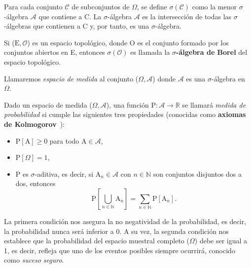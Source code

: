 \begin{definicion}\label{def:sigma-algebra-borel}
    Para cada conjunto $\mathcal{C}$ de subconjuntos de $\Omega$, se define $\sigma(\mathcal{C})$ como la menor $\sigma$-álgebra $\mathcal{A}$ que contiene a C. La $\sigma$-álgebra $\mathcal{A}$ es la intersección de todas las $\sigma$-álgebras que contienen a C y, por tanto, es una $\sigma$-álgebra.

    Si ($\mathrm{E}, \mathcal{O}$) es un espacio topológico, donde $\mathrm{O}$ es el conjunto formado por los conjuntos abiertos en E, entonces $\sigma(\mathcal{O})$ es llamada la \textbf{$\sigma$-álgebra de Borel} del espacio topológico.
\end{definicion}

Llamaremos \emph{espacio de medida} al conjunto ($\Omega, \mathcal{A}$) donde $\mathcal{A}$ es una $\sigma$-álgebra en $\Omega$.\newline

\begin{definicion}\label{def:medida-de-probabilidad}
    Dado un espacio de medida ($\Omega, \mathcal{A}$), una función $\mathrm{P}: \mathcal{A} \to \mathbb{R}$ se llamará \emph{medida de probabilidad} si cumple las siguientes tres propiedades (conocidas como \textbf{axiomas de Kolmogorov}~\cite{Kolmogorov1956}):

    \begin{itemize}
        \item $\mathrm{P}[\mathrm{A}] \ge 0$ para todo $\mathrm{A} \in \mathcal{A}$,
        \item $\mathrm{P}[\Omega]=1$,
        \item $\mathrm{P}$ es $\sigma$-aditiva, es decir, si $\mathrm{A}_n \in \mathcal{A}$ con $n \in \mathbb{N}$ son conjuntos disjuntos dos a dos, entonces 
        \[ \mathrm{P}\left[\bigcup_{n \in \mathbb{N}} \mathrm{A}_{n}\right] = \sum\limits_{n \in \mathbb{N}} \mathrm{P}[\mathrm{A}_n]. \]
    \end{itemize}
\end{definicion}

La primera condición nos asegura la no negatividad de la probabilidad, es decir, la probabilidad nunca será inferior a $0$. A su vez, la segunda condición nos establece que la probabilidad del espacio muestral completo ($\Omega$) debe ser igual a 1, es decir, refleja que uno de los eventos posibles siempre ocurrirá, conocido como \emph{suceso seguro}.\newline

